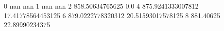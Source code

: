 0 nan nan
1 nan nan
2 858.50634765625 0.0
4 875.9241333007812 17.41778564453125
6 879.0222778320312 20.51593017578125
8 881.40625 22.89990234375
